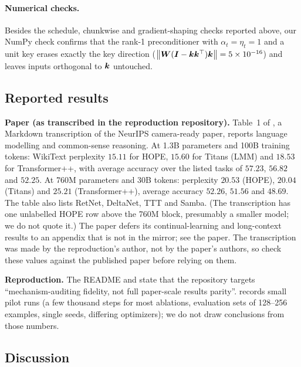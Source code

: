 \paragraph{Numerical checks.} Besides the schedule, chunkwise and gradient-shaping checks reported
above, our NumPy check confirms that the rank-1 preconditioner with $\alpha_t = \eta_t = 1$ and a
unit key erases exactly the key direction ($\left\lVert \bm{W}(\bm{I} - \bm{k}\bm{k}^{\top})\bm{k}\right\rVert = 5\times10^{-16}$) and
leaves inputs orthogonal to $\bm{k}$ untouched.

\subsection{Reported results}\label{sec:c11-nl-results}

\begin{results}
\textbf{Paper (as transcribed in the reproduction repository).} Table~1 of
,
a Markdown transcription of the NeurIPS camera-ready paper, reports language modelling and
common-sense reasoning. At 1.3B parameters and 100B training tokens: WikiText perplexity $15.11$
for HOPE, $15.60$ for Titans (LMM) and $18.53$ for Transformer++, with average accuracy over the
listed tasks of $57.23$, $56.82$ and $52.25$. At 760M parameters and 30B tokens: perplexity
$20.53$ (HOPE), $20.04$ (Titans) and $25.21$ (Transformer++), average accuracy $52.26$, $51.56$
and $48.69$. The table also lists RetNet, DeltaNet, TTT and Samba. (The transcription has one
unlabelled HOPE row above the 760M block, presumably a smaller model; we do not quote it.) The
paper defers its continual-learning and long-context results to an appendix that is not in the
mirror; see the paper. The transcription was made by the reproduction's author, not by the
paper's authors, so check these values against the published paper before relying on them.

\textbf{Reproduction.} The README and  state that the repository
targets ``mechanism-auditing fidelity, not full paper-scale results parity''.
 records small pilot runs (a few thousand steps for most ablations,
evaluation sets of 128--256 examples, single seeds, differing optimizers); we do not draw
conclusions from those numbers.
\end{results}

\subsection{Discussion}\label{sec:c11-nl-discussion}


